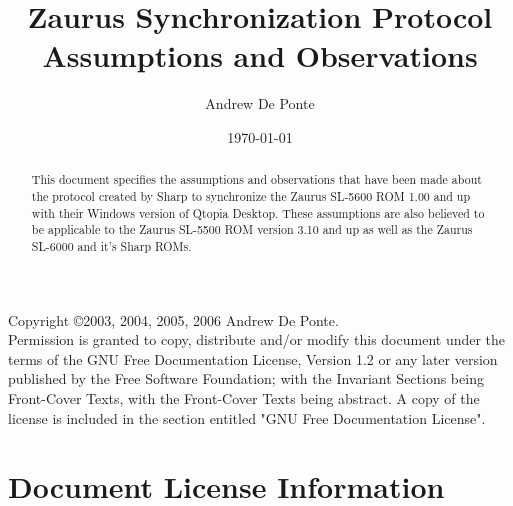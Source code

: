 \documentclass{report}
\title{Zaurus Synchronization Protocol Assumptions and Observations}
\author{Andrew De Ponte}
\date{\today}
\begin{document}
\maketitle

\begin{abstract}
This document specifies the assumptions and observations that have been made
about the protocol created by Sharp to synchronize the Zaurus SL-5600 ROM 1.00
and up with their Windows version of Qtopia Desktop. These assumptions are
also believed to be applicable to the Zaurus SL-5500 ROM version 3.10 and up
as well as the Zaurus SL-6000 and it's Sharp ROMs.
\end{abstract}

\newpage

\noindent Copyright \copyright 2003, 2004, 2005, 2006 Andrew De Ponte.\\
Permission is granted to copy, distribute and/or modify this document
under the terms of the GNU Free Documentation License, Version 1.2
or any later version published by the Free Software Foundation;
with the Invariant Sections being Front-Cover Texts, with the
Front-Cover Texts being abstract. A copy of the license is included
in the section entitled "GNU Free Documentation License".

\newpage

\tableofcontents

\newpage





\part{Document License Information}


\end{document}
